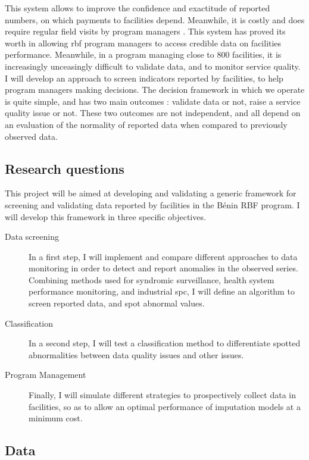 This system allows to improve the confidence and exactitude of reported numbers, on which payments to facilities depend. Meanwhile, it is costly and does require regular field visits by program managers \citep{antony_exploring_2017}. This system has proved its worth in allowing \gls{rbf} program managers to access credible data on facilities performance. Meanwhile, in a program managing close to 800 facilities, it is increasingly unceasingly difficult to validate data, and to monitor service quality. I will develop an approach to screen indicators reported by facilities, to help program managers making decisions. The decision framework in which we operate is quite simple, and has two main outcomes : validate data or not, raise a service quality issue or not. These two outcomes are not independent, and all depend on an evaluation of the normality of reported data when compared to previously observed data.

\subsection{Research questions}

This project will be aimed at developing and validating a generic framework for screening and validating data reported by facilities in the Bénin RBF program. I will develop this framework in three specific objectives.

\begin{description}
	\item[Data screening] In a first step, I will implement and compare different approaches to data monitoring in order to detect and report anomalies in the observed series. Combining methods used for syndromic surveillance, health system performance monitoring, and industrial \gls{spc}, I will define an algorithm to screen reported data, and spot abnormal values.
	\item[Classification] In a second step, I will test a classification method to differentiate spotted abnormalities between data quality issues and other issues.
	\item[Program Management] Finally, I will simulate different strategies to prospectively collect data in facilities, so as to allow an optimal performance of imputation models at a minimum cost.
\end{description}

\subsection{Data}
\label{paper2_data}

